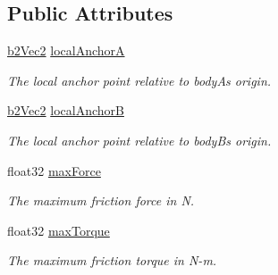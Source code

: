 \subsection*{Public Attributes}
\begin{DoxyCompactItemize}
\item 
\hyperlink{structb2_vec2}{b2\+Vec2} \hyperlink{structb2_friction_joint_def_a00b246e60ae282a956a42b662993e92a}{local\+AnchorA}\hypertarget{structb2_friction_joint_def_a00b246e60ae282a956a42b662993e92a}{}\label{structb2_friction_joint_def_a00b246e60ae282a956a42b662993e92a}

\begin{DoxyCompactList}\small\item\em The local anchor point relative to bodyA\textquotesingle{}s origin. \end{DoxyCompactList}\item 
\hyperlink{structb2_vec2}{b2\+Vec2} \hyperlink{structb2_friction_joint_def_ad6d5a5614a7ac77b13e53fda3e32ed05}{local\+AnchorB}\hypertarget{structb2_friction_joint_def_ad6d5a5614a7ac77b13e53fda3e32ed05}{}\label{structb2_friction_joint_def_ad6d5a5614a7ac77b13e53fda3e32ed05}

\begin{DoxyCompactList}\small\item\em The local anchor point relative to bodyB\textquotesingle{}s origin. \end{DoxyCompactList}\item 
float32 \hyperlink{structb2_friction_joint_def_ad30e97a80790d4ca64bac7a1fa7d1b35}{max\+Force}\hypertarget{structb2_friction_joint_def_ad30e97a80790d4ca64bac7a1fa7d1b35}{}\label{structb2_friction_joint_def_ad30e97a80790d4ca64bac7a1fa7d1b35}

\begin{DoxyCompactList}\small\item\em The maximum friction force in N. \end{DoxyCompactList}\item 
float32 \hyperlink{structb2_friction_joint_def_a61adfb0ee7c0ed4cb8feee8304c16ef6}{max\+Torque}\hypertarget{structb2_friction_joint_def_a61adfb0ee7c0ed4cb8feee8304c16ef6}{}\label{structb2_friction_joint_def_a61adfb0ee7c0ed4cb8feee8304c16ef6}

\begin{DoxyCompactList}\small\item\em The maximum friction torque in N-\/m. \end{DoxyCompactList}\end{DoxyCompactItemize}


